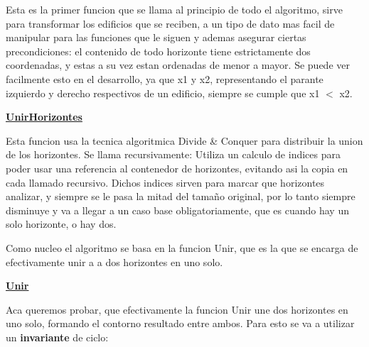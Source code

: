 Esta es la primer funcion que se llama al principio de todo el algoritmo, sirve para transformar los edificios que se reciben, a un tipo de dato mas facil de manipular para las funciones que le siguen y ademas asegurar ciertas precondiciones: el contenido de todo horizonte tiene estrictamente dos coordenadas, y estas a su vez estan ordenadas de menor a mayor. Se puede ver facilmente esto en el desarrollo, ya que x1 y x2, representando el parante izquierdo y derecho respectivos de un edificio, siempre se cumple que x1 $<$ x2.

\noindent \underline{\textbf{UnirHorizontes}}

Esta funcion usa la tecnica algoritmica Divide \& Conquer para distribuir la union de los horizontes. Se llama recursivamente: Utiliza un calculo de indices para poder usar una referencia al contenedor de horizontes, evitando asi la copia en cada llamado recursivo. Dichos indices sirven para marcar que horizontes analizar, y siempre se le pasa la mitad del tamaño original, por lo tanto siempre disminuye y va a llegar a un caso base obligatoriamente, que es cuando hay un solo horizonte, o hay dos.

Como nucleo el algoritmo se basa en la funcion Unir, que es la que se encarga de efectivamente unir a a dos horizontes en uno solo.

\noindent \underline{\textbf{Unir}}

Aca queremos probar, que efectivamente la funcion Unir une dos horizontes en uno solo, formando el contorno resultado entre ambos. Para esto se va a utilizar un \textbf{invariante} de ciclo: 

